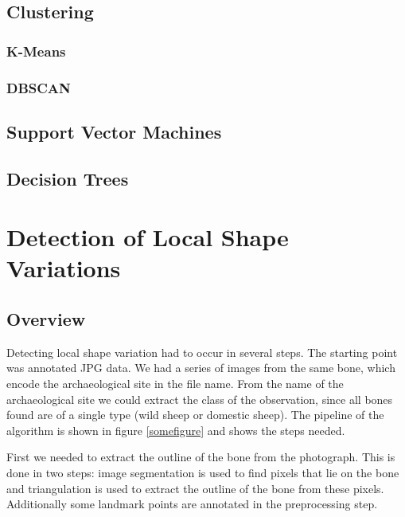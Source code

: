 \documentclass[pdftex,12pt,a4paper]{report}
\begin{document}
\section{Clustering}

\subsection{K-Means}

\subsection{DBSCAN}

\section{Support Vector Machines}

\cite{pedregosa2011scikit}

\section{Decision Trees}
\label{sec:basics-decision-trees}

\chapter{Detection of Local Shape Variations}
\label{chapter:detecting-shape-variations}

\section{Overview}

Detecting local shape variation had to occur in several steps. The starting point was annotated JPG data. We had a series of images from the same bone, which encode the archaeological site in the file name. From the name of the archaeological site we could extract the class of the observation, since all bones found are of a single type (wild sheep or domestic sheep). The pipeline of the algorithm is shown in figure \ref{somefigure} and shows the steps needed.

First we needed to extract the outline of the bone from the photograph. This is done in two steps: image segmentation is used to find pixels that lie on the bone and triangulation is used to extract the outline of the bone from these pixels. Additionally some landmark points are annotated in the preprocessing step.
\end{document}
